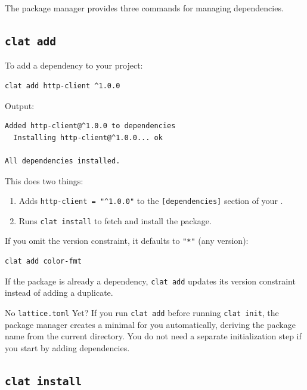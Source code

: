 The package manager provides three commands for managing dependencies.

\subsection{\texttt{clat add}}\label{subsec:clat-add}

To add a dependency to your project:

\begin{lstlisting}[language=bash, numbers=none]
clat add http-client ^1.0.0
\end{lstlisting}

Output:

\begin{lstlisting}[language=bash, numbers=none]
Added http-client@^1.0.0 to dependencies
  Installing http-client@^1.0.0... ok

All dependencies installed.
\end{lstlisting}

This does two things:

\begin{enumerate}
  \item Adds \lstinline|http-client = "^1.0.0"| to the \texttt{[dependencies]} section of your .
  \item Runs \texttt{clat install} to fetch and install the package.
\end{enumerate}

If you omit the version constraint, it defaults to \lstinline|"*"| (any version):

\begin{lstlisting}[language=bash, numbers=none]
clat add color-fmt
\end{lstlisting}

If the package is already a dependency, \texttt{clat add} updates its version constraint instead of adding a duplicate.

\begin{notebox}{No \texttt{lattice.toml} Yet?}
If you run \texttt{clat add} before running \texttt{clat init}, the package manager creates a minimal  for you automatically, deriving the package name from the current directory.
You do not need a separate initialization step if you start by adding dependencies.
\end{notebox}

\subsection{\texttt{clat install}}\label{subsec:clat-install}

